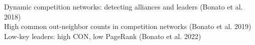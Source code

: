 \documentclass[preview]{standalone}
\begin{document}
Dynamic competition networks: detecting alliances and leaders (Bonato et al. 2018)\\High common out-neighbor counts in competition networks (Bonato et al. 2019)\\Low-key leaders: high CON, low PageRank (Bonato et al. 2022)\\
\end{document}
